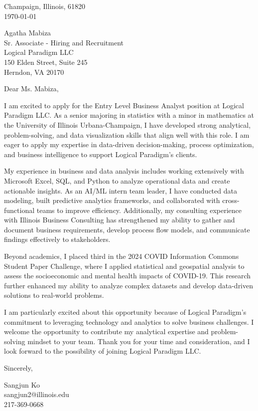 \documentclass[11pt]{article}
\begin{document}
\noindent
Champaign, Illinois, 61820 \\
\today
\vspace{2em}

\noindent
Agatha Mabiza \\
Sr. Associate - Hiring and Recruitment \\
Logical Paradigm LLC \\
150 Elden Street, Suite 245 \\
Herndon, VA 20170 \\

\vspace{1.5em}

Dear Ms. Mabiza,

I am excited to apply for the Entry Level Business Analyst position at Logical Paradigm LLC. As a senior majoring in statistics with a minor in mathematics at the University of Illinois Urbana-Champaign, I have developed strong analytical, problem-solving, and data visualization skills that align well with this role. I am eager to apply my expertise in data-driven decision-making, process optimization, and business intelligence to support Logical Paradigm’s clients.

My experience in business and data analysis includes working extensively with Microsoft Excel, SQL, and Python to analyze operational data and create actionable insights. As an AI/ML intern team leader, I have conducted data modeling, built predictive analytics frameworks, and collaborated with cross-functional teams to improve efficiency. Additionally, my consulting experience with Illinois Business Consulting has strengthened my ability to gather and document business requirements, develop process flow models, and communicate findings effectively to stakeholders.

Beyond academics, I placed third in the 2024 COVID Information Commons Student Paper Challenge, where I applied statistical and geospatial analysis to assess the socioeconomic and mental health impacts of COVID-19. This research further enhanced my ability to analyze complex datasets and develop data-driven solutions to real-world problems.

I am particularly excited about this opportunity because of Logical Paradigm’s commitment to leveraging technology and analytics to solve business challenges. I welcome the opportunity to contribute my analytical expertise and problem-solving mindset to your team. Thank you for your time and consideration, and I look forward to the possibility of joining Logical Paradigm LLC.


\vspace{1em}

Sincerely,

\vspace{2em}

\noindent
Sangjun Ko\\
sangjun2@illinois.edu\\
217-369-0668
\end{document}
